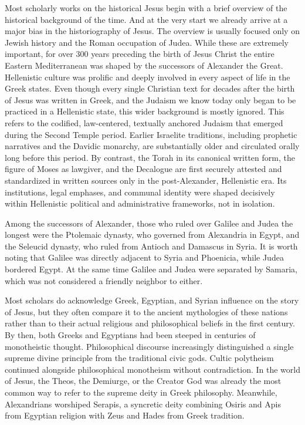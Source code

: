 Most scholarly works on the historical Jesus begin with a brief overview of the historical background of the time.
And at the very start we already arrive at a major bias in the historiography of Jesus.
The overview is usually focused only on Jewish history and the Roman occupation of Judea.
While these are extremely important, for over 300 years preceding the birth of Jesus Christ the entire Eastern Mediterranean was shaped by the successors of Alexander the Great.
Hellenistic culture was prolific and deeply involved in every aspect of life in the Greek states.
Even though every single Christian text for decades after the birth of Jesus was written in Greek, and the Judaism we know today only began to be practiced in a Hellenistic state, this wider background is mostly ignored.
This refers to the codified, law-centered, textually anchored Judaism that emerged during the Second Temple period.
Earlier Israelite traditions, including prophetic narratives and the Davidic monarchy, are substantially older and circulated orally long before this period.
By contrast, the Torah in its canonical written form, the figure of Moses as lawgiver, and the Decalogue are first securely attested and standardized in written sources only in the post-Alexander, Hellenistic era.
Its institutions, legal emphases, and communal identity were shaped decisively within Hellenistic political and administrative frameworks, not in isolation.

Among the successors of Alexander, those who ruled over Galilee and Judea the longest were the Ptolemaic dynasty, who governed from Alexandria in Egypt, and the Seleucid dynasty, who ruled from Antioch and Damascus in Syria.
It is worth noting that Galilee was directly adjacent to Syria and Phoenicia, while Judea bordered Egypt.
At the same time Galilee and Judea were separated by Samaria, which was not considered a friendly neighbor to either.

Most scholars do acknowledge Greek, Egyptian, and Syrian influence on the story of Jesus, but they often compare it to the ancient mythologies of these nations rather than to their actual religious and philosophical beliefs in the first century.
By then, both Greeks and Egyptians had been steeped in centuries of monotheistic thought.
Philosophical discourse increasingly distinguished a single supreme divine principle from the traditional civic gods.
Cultic polytheism continued alongside philosophical monotheism without contradiction.
In the world of Jesus, the Theos, the Demiurge, or the Creator God was already the most common way to refer to the supreme deity in Greek philosophy.
Meanwhile, Alexandrians worshiped Serapis, a syncretic deity combining Osiris and Apis from Egyptian religion with Zeus and Hades from Greek tradition.

